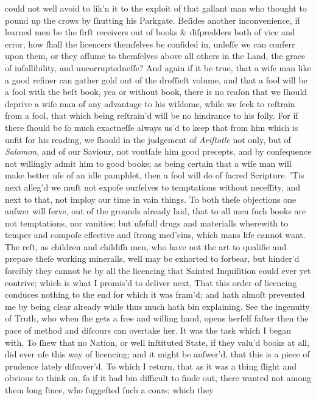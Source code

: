could not well avoid to lik'n it to the exploit of that gallant man who thought
to pound up the crows by ſhutting his Parkgate.  Beſides another inconvenience,
if learned men be the firſt receivers out of books \& diſpredders both of vice
and error, how ſhall the licencers themſelves be confided in, unleſſe we can
conferr upon them, or they aſſume to themſelves above all others in the Land,
the grace of infallibility, and uncorruptedneſſe?  And again if it be true, that
a wiſe man like a good refiner can gather gold out of the droſſieſt volume, and
that a fool will be a fool with the beſt book, yea or without book, there is no
reaſon that we ſhould deprive a wiſe man of any advantage to his wiſdome, while
we ſeek to reſtrain from a fool, that which being reſtrain'd will be no
hindrance to his folly.  For if there ſhould be ſo much exactneſſe always us'd
to keep that from him which is unfit for his reading, we ſhould in the judgement
of \textit{Ariſtotle} not only, but of \textit{Salomon}, and of our Saviour, not
voutſafe him good precepts, and by conſequence not willingly admit him to good
books; as being certain that a wiſe man will make better uſe of an idle
pamphlet, then a fool will do of ſacred Scripture. 'Tis next alleg'd we muſt not
expoſe ourſelves to temptations without neceſſity, and next to that, not imploy
our time in vain things.  To both theſe objections one anſwer will ſerve, out of
the grounds already laid, that to all men ſuch books are not temptations, nor
vanities; but uſefull drugs and materialls wherewith to temper and compoſe
effective and ſtrong med'cins, which mans life cannot want.  The reſt, as
children and childiſh men, who have not the art to qualifie and prepare theſe
working mineralls, well may be exhorted to forbear, but hinder'd forcibly they
cannot be by all the licencing that Sainted Inquiſition could ever yet contrive;
which is what I promis'd to deliver next, That this order of licencing conduces
nothing to the end for which it was fram'd; and hath almoſt prevented me by
being clear already while thus much hath bin explaining.  See the ingenuity of
Truth, who when ſhe gets a free and willing hand, opens herſelf faſter then the
pace of method and diſcours can overtake her.  It was the task which I began
with, To ſhew that no Nation, or well inſtituted State, if they valu'd books at
all, did ever uſe this way of licencing; and it might be anſwer'd, that this is
a piece of prudence lately diſcover'd.  To which I return, that as it was a
thing ſlight and obvious to think on, ſo if it had bin difficult to finde out,
there wanted not among them long ſince, who ſuggeſted ſuch a cours; which they
